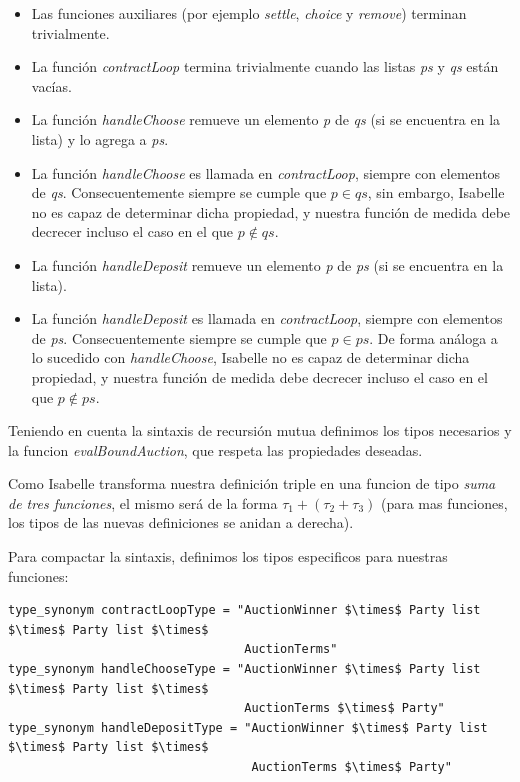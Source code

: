 \documentclass[12pt]{book}
\begin{document}
\begin{itemize}
    \item Las funciones auxiliares (por ejemplo \textit{settle}, \textit{choice} y \textit{remove}) terminan trivialmente.
    \item La función \textit{contractLoop} termina trivialmente cuando las listas \textit{ps} y \textit{qs} están vacías.
    \item La función \textit{handleChoose} remueve un elemento \textit{p} de \textit{qs} (si se encuentra en la lista) y lo agrega a \textit{ps}.
    \item La función \textit{handleChoose} es llamada en \textit{contractLoop}, siempre con elementos de \textit{qs}. Consecuentemente siempre se cumple que $p \in qs$, sin embargo, Isabelle no es capaz de determinar dicha propiedad, y nuestra función de medida debe decrecer incluso el caso en el que $p \notin qs$.
    \item La función \textit{handleDeposit} remueve un elemento \textit{p} de \textit{ps} (si se encuentra en la lista).
    \item La función \textit{handleDeposit} es llamada en \textit{contractLoop}, siempre con elementos de \textit{ps}. Consecuentemente siempre se cumple que $p \in ps$. De forma análoga a lo sucedido con \textit{handleChoose}, Isabelle no es capaz de determinar dicha propiedad, y nuestra función de medida debe decrecer incluso el caso en el que $p \notin ps$.
\end{itemize}

Teniendo en cuenta la sintaxis de recursión mutua definimos los tipos necesarios y la funcion \textit{evalBoundAuction}, que respeta las propiedades deseadas.

Como Isabelle transforma nuestra definición triple en una funcion de tipo \textit{suma de tres funciones}, el mismo será de la forma $\tau_1 + (\tau_2 + \tau_3)$ (para mas funciones, los tipos de las nuevas definiciones se anidan a derecha). 

Para compactar la sintaxis, definimos los tipos especificos para nuestras funciones:

\begin{lstlisting}[style=Isabelle]
type_synonym contractLoopType = "AuctionWinner $\times$ Party list $\times$ Party list $\times$
                                 AuctionTerms"
type_synonym handleChooseType = "AuctionWinner $\times$ Party list $\times$ Party list $\times$
                                 AuctionTerms $\times$ Party"
type_synonym handleDepositType = "AuctionWinner $\times$ Party list $\times$ Party list $\times$
                                  AuctionTerms $\times$ Party"
\end{lstlisting}
\end{document}
